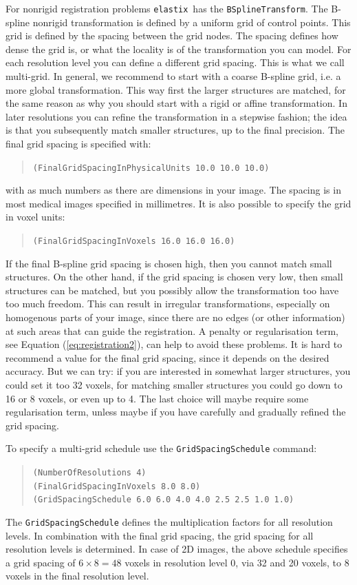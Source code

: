 \documentclass[]{report}
\newcommand{\elastix}{\texttt{elastix}}
\begin{document}
For nonrigid registration problems \elastix\ has the
\texttt{BSplineTransform}. The B-spline nonrigid transformation is
defined by a uniform grid of control points. This grid is defined by
the spacing between the grid nodes. The spacing defines how dense the
grid is, or what the locality is of the transformation you can model.
For each resolution level you can define a different grid spacing.
This is what we call multi-grid. In general, we recommend to start
with a coarse B-spline grid, i.e. a more global transformation. This
way first the larger structures are matched, for the same reason as
why you should start with a rigid or affine transformation. In later
resolutions you can refine the transformation in a stepwise fashion;
the idea is that you subsequently match smaller structures, up to the
final precision. The final grid spacing is specified with:
\begin{quote}
\texttt{(FinalGridSpacingInPhysicalUnits 10.0 10.0 10.0)}
\end{quote}
with as much numbers as there are dimensions in your image. The
spacing is in most medical images specified in millimetres. It is
also possible to specify the grid in voxel units:
\begin{quote}
\texttt{(FinalGridSpacingInVoxels 16.0 16.0 16.0)}
\end{quote}
If the final B-spline grid spacing is chosen high, then you cannot
match small structures. On the other hand, if the grid spacing is
chosen very low, then small structures can be matched, but you
possibly allow the transformation too have too much freedom. This can
result in irregular transformations, especially on homogenous parts
of your image, since there are no edges (or other information) at
such areas that can guide the registration. A penalty or
regularisation term, see Equation (\ref{eq:registration2}), can help
to avoid these problems. It is hard to recommend a value for the
final grid spacing, since it depends on the desired accuracy. But we
can try: if you are interested in somewhat larger structures, you
could set it too 32 voxels, for matching smaller structures you could
go down to 16 or 8 voxels, or even up to 4. The last choice will
maybe require some regularisation term, unless maybe if you have
carefully and gradually refined the grid spacing.

To specify a multi-grid schedule use the \texttt{GridSpacingSchedule}
command:
\begin{quote}
\texttt{(NumberOfResolutions 4)} \\
\texttt{(FinalGridSpacingInVoxels 8.0 8.0)} \\
\texttt{(GridSpacingSchedule 6.0 6.0 4.0 4.0 2.5 2.5 1.0 1.0)}
\end{quote}
The \texttt{GridSpacingSchedule} defines the multiplication factors
for all resolution levels. In combination with the final grid
spacing, the grid spacing for all resolution levels is determined. In
case of 2D images, the above schedule specifies a grid spacing of $6
\times 8 = 48$ voxels in resolution level 0, via 32 and 20 voxels, to
8 voxels in the final resolution level.
\end{document}
